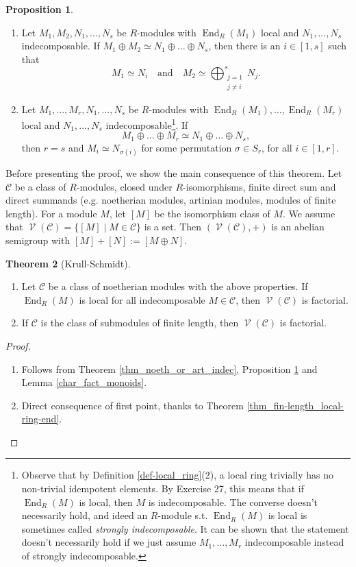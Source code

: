\documentclass[12pt,a4paper]{report}
\theoremstyle{definition}
\newtheorem{theorem}{Theorem}[chapter] %
\newtheorem{proposition}[theorem]{Proposition}
\theoremstyle{num.custom-title}
\DeclareMathOperator{\End}{End}
\DeclareMathOperator{\V}{\mathcal{V}}
\begin{document}
\begin{proposition}\label{prop_unique_decomp}\ 
\begin{enumerate}
\item Let $M_1,M_2,N_1,...,N_s$ be $R$-modules with $\End_R(M_1)$ local and $N_1,...,N_s$ indecomposable. If $M_1 \oplus M_2 \simeq N_1 \oplus \ldots \oplus N_s$, then there is an $i \in [1,s]$ such that
\[
M_1 \simeq N_i \quad \text{and} \quad M_2 \simeq \bigoplus_{\substack{j=1 \\ j \neq i}}^s N_j.
\]
\item Let $M_1,...,M_r,N_1,...,N_s$ be $R$-modules with $\End_R(M_1),...,\End_R(M_r)$ local and $N_1,...,N_s$ indecomposable\footnote{Observe that by Definition \ref{def-local_ring}(2), a local ring trivially has no non-trivial idempotent elements. By Exercise 27, this means that if $\End_R(M)$ is local, then $M$ is indecomposable. The converse doesn't necessarily hold, and ideed an $R$-module s.t. $\End_R(M)$ is local is sometimes called \emph{strongly indecomposable}. It can be shown that the statement doesn't necessarily hold if we just assume $M_1,...,M_r$ indecomposable instead of strongly indecomposable.}. If 
\[
M_1 \oplus \ldots \oplus M_r \simeq N_1 \oplus \ldots \oplus N_s,
\]
then $r=s$ and $M_i \simeq N_{\sigma(i)}$ for some permutation $\sigma \in S_r$, for all $i \in [1,r]$.
\end{enumerate}
\end{proposition}

Before presenting the proof, we show the main consequence of this theorem. Let $\mathcal{C}$ be a class of $R$-modules, closed under $R$-isomorphisms, finite direct sum and direct summands (e.g. noetherian modules, artinian modules, modules of finite length). For a module $M$, let $[M]$ be the isomorphism class of $M$. We assume that $\V(\mathcal{C})=\{[M] \mid M \in \mathcal{C}\}$ is a set. Then $(\V(\mathcal{C}),+)$ is an abelian semigroup with $[M]+[N] := [M \oplus N]$.

\begin{theorem}[Krull-Schmidt]\ 
\begin{enumerate}
\item Let $\mathcal{C}$ be a class of noetherian modules with the above properties. If $\End_R(M)$ is local for all indecomposable $M \in \mathcal{C}$, then $\V(\mathcal{C})$ is factorial.
\item If $\mathcal{C}$ is the class of submodules of finite length, then $\V(\mathcal{C})$ is factorial.
\end{enumerate}
\begin{proof}\ 
\begin{enumerate}
\item Follows from Theorem \ref{thm_noeth_or_art_indec}, Proposition \ref{prop_unique_decomp} and Lemma \ref{char_fact_monoids}.
\item Direct consequence of first point, thanks to Theorem \ref{thm_fin-length_local-ring-end}.
\end{enumerate}
\end{proof}
\end{theorem}
\end{document}
